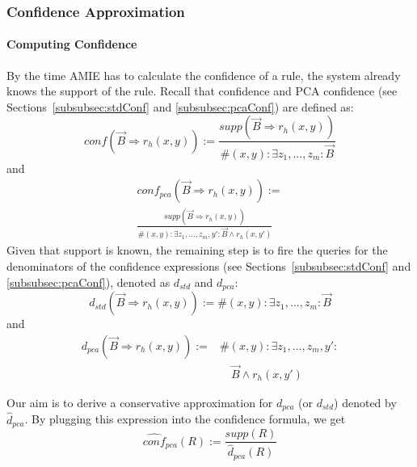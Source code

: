 \subsubsection{Confidence Approximation}\label{sec:conf_appr}


\paragraph{Computing Confidence} By the time AMIE has to calculate the confidence of a rule, the system already knows the support of the rule.
Recall that confidence and PCA confidence (see Sections~\ref{subsubsec:stdConf} and \ref{subsubsec:pcaConf}) are defined as:
\[conf(\vec{B} \Rightarrow r_h(x,y)) := \frac{supp(\vec{B} \Rightarrow r_h(x,y))}{\#(x,y): \exists z_1,...,z_m: \vec{B}}\]
and
\begin{multline*}
conf_{pca}(\vec{B} \Rightarrow r_h(x,y)) :=\\
\frac{supp(\vec{B} \Rightarrow r_h(x,y))}{\#(x,y): \exists z_1,...,z_m,y': \vec{B} \wedge r_h(x,y')}
\end{multline*}
\noindent Given that support is known, the remaining step is to fire the queries for the denominators of the confidence expressions
(see Sections~\ref{subsubsec:stdConf} and \ref{subsubsec:pcaConf}), denoted as $d_{std}$ and $d_{pca}$:
\begin{equation} \label{eq:denomStandardConf}
 d_{std}(\vec{B} \Rightarrow r_h(x,y)):= \#(x,y): \exists z_1,...,z_m: \vec{B}
\end{equation}
and
\begin{equation} \label{eq:denomPCA}
\begin{array}{rl}
d_{pca}(\vec{B} \Rightarrow r_h(x,y)) := {}& \#(x,y): \exists z_1,...,z_m,y': \\ &\quad \vec{B} \wedge r_h(x,y')
\end{array}
\end{equation}



Our aim is to derive a conservative approximation for $d_{pca}$ (or $d_{std}$) denoted by
$\widehat{d}_{pca}$. By plugging this expression into the confidence formula, we get
\begin{equation} \label{eq:pcaApproxConf}
  \widehat{conf}_{pca}(R):=\frac{supp(R)}{\widehat{d}_{pca}(R)}
\end{equation}

